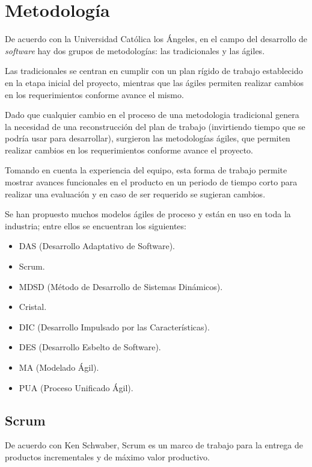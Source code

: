 
\section{Metodología}
De acuerdo con la Universidad Católica los Ángeles\cite{universidad_catolica_los_angeles_metodologidesarrollo_2020}, en el campo del desarrollo de \textit{software} hay dos grupos de metodologías: las tradicionales y las ágiles.


Las tradicionales se centran en cumplir con un plan rígido de trabajo establecido en la etapa inicial del proyecto, mientras que las ágiles permiten realizar cambios en los requerimientos conforme avance el mismo.


Dado que cualquier cambio en el proceso de una metodologia tradicional genera la necesidad de una reconstrucción del plan de trabajo (invirtiendo tiempo que se podría usar para desarrollar), surgieron las metodologías ágiles, que permiten realizar cambios en los requerimientos conforme avance el proyecto. 


Tomando en cuenta la experiencia del equipo, esta forma de trabajo permite mostrar avances funcionales en el producto en un periodo de tiempo corto para realizar una evaluación y en caso de ser requerido se sugieran cambios.


Se han propuesto muchos modelos ágiles de proceso y están en uso en toda la industria; entre ellos se encuentran los siguientes:


\begin{itemize}
	\item DAS (Desarrollo Adaptativo de Software).
	\item Scrum.
	\item MDSD (Método de Desarrollo de Sistemas Dinámicos).
	\item Cristal.
	\item DIC (Desarrollo Impulsado por las Características).
	\item DES (Desarrollo Esbelto de Software).
	\item MA (Modelado Ágil).
	\item PUA (Proceso Unificado Ágil).
\end{itemize}

\subsection{Scrum}

De acuerdo con Ken Schwaber\cite{the_scrum_guide_definitive_2020}, Scrum es un marco de trabajo para la entrega de productos incrementales y de máximo valor productivo.

